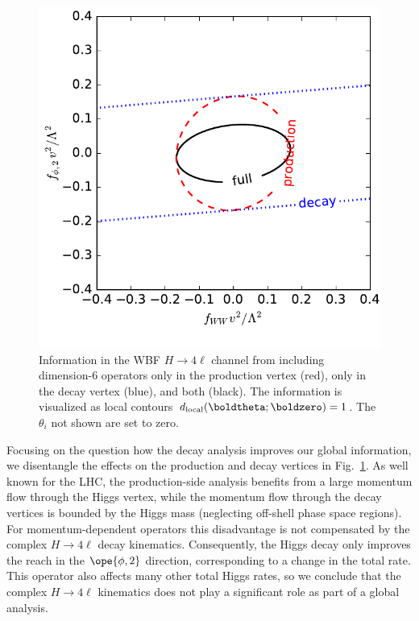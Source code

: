 \begin{figure}[b]
  \includegraphics[height=0.45 \textwidth]{fig/information/wbf_4l_production_decay_fphi2_fww}
  \caption{Information in the WBF $H \to 4\ell$ channel from including
    dimension-6 operators only in the production vertex (red), only in
    the decay vertex (blue), and both (black). The information is
    visualized as local contours
    $d_{\text{local}}(\boldtheta ; \boldzero) = 1$. The $\theta_i$ not shown
    are set to zero.}
\label{fig:information_wbf_4l_production_decay}
\end{figure}

Focusing on the question how the decay analysis improves our global
information, we disentangle the effects on the production and decay
vertices in Fig.~\ref{fig:information_wbf_4l_production_decay}.  As well known for
the LHC, the production-side analysis benefits from a large momentum
flow through the Higgs vertex, while the momentum flow through the
decay vertices is bounded by the Higgs mass (neglecting off-shell
phase space regions).  For momentum-dependent operators this
disadvantage is not compensated by the complex $H \to 4\ell$ decay
kinematics.  Consequently, the Higgs decay only improves the reach in
the $\ope{\phi,2}$ direction, corresponding to a change in the total rate. 
This operator also affects many other total Higgs rates,
so we conclude that the complex $H \to 4\ell$ kinematics
does not play a significant role as part of a global analysis.\bigskip 


